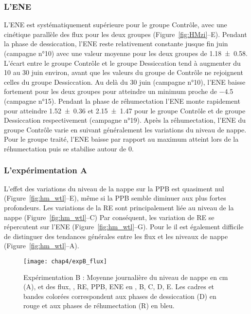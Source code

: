 \subsubsection{L'ENE}

L'ENE est systématiquement supérieure pour le groupe Contrôle, avec une cinétique parallèle des flux pour les deux groupes (Figure~\ref{fig:HMzi}--E).
Pendant la phase de dessiccation, l'ENE reste relativement constante jusque fin juin (campagne n°10) avec une valeur moyenne pour les deux groupes de \SI{1.18(058)}{\uml}.
L'écart entre le groupe Contrôle et le groupe Dessiccation tend à augmenter du 10 au 30 juin environ, avant que les valeurs du groupe de Contrôle ne rejoignent celles du groupe Dessiccation.
Au delà du 30 juin (campagne n°10), l'ENE baisse fortement pour les deux groupes pour atteindre un minimum proche de \SI{-4.5}{\uml} (campagne n°15).
Pendant la phase de réhumectation l'ENE monte rapidement pour atteindre \num{1.52(036)} et \SI{2.15(147)}{\uml} pour le groupe Contrôle et de groupe Dessiccation respectivement (campagne n°19).
Après la réhumectation, l'ENE du groupe Contrôle varie en suivant généralement les variations du niveau de nappe.
Pour le groupe traité, l'ENE baisse par rapport au maximum atteint lors de la réhumectation puis se stabilise autour de 0.

\subsubsection{L'expérimentation A}

L'effet des variations du niveau de la nappe sur la PPB est quasiment nul (Figure~\ref{fig:hm_wtl}--E), même si la PPB semble diminuer aux plus fortes profondeurs.
Les variations de la RE sont principalement liée au niveau de la nappe (Figure~\ref{fig:hm_wtl}--C) Par conséquent, les variation de RE se répercutent sur l'ENE (Figure~\ref{fig:hm_wtl}--G).
Pour le \chh il est également difficile de distinguer des tendances générales entre les flux et les niveaux de nappe (Figure~\ref{fig:hm_wtl}--A).

\begin{figure}
\centering
\texttt{[image: chap4/expB\_flux]}
\caption{Expérimentation B : Moyenne journalière du niveau de nappe en cm (A), et des flux, \chh, RE, PPB, ENE en \si{\uml}, B, C, D, E. Les cadres et bandes colorées correspondent aux phases de dessiccation (D) en rouge et aux phases de réhumectation (R) en bleu.}
\label{fig:HMty}
\end{figure}

